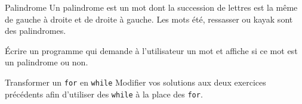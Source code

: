 \documentclass[a4paper,11pt]{article}
\begin{document}
	\begin{Exercice}{Palindrome}
		Un palindrome est un mot dont la succession de lettres est la même 
		de gauche à droite et de droite à gauche. 
		Les mots été, ressasser ou kayak sont des palindromes.
		  	
		\'Ecrire un programme qui demande à l'utilisateur 
		un mot et affiche si ce mot est un palindrome ou non.
	\end{Exercice}

	\begin{Exercice}{Transformer un \texttt{for} en \texttt{while}}
		Modifier vos solutions aux deux exercices précédents afin d'utiliser des \texttt{while} à la place des \texttt{for}. 
	\end{Exercice}

	
\end{document}
